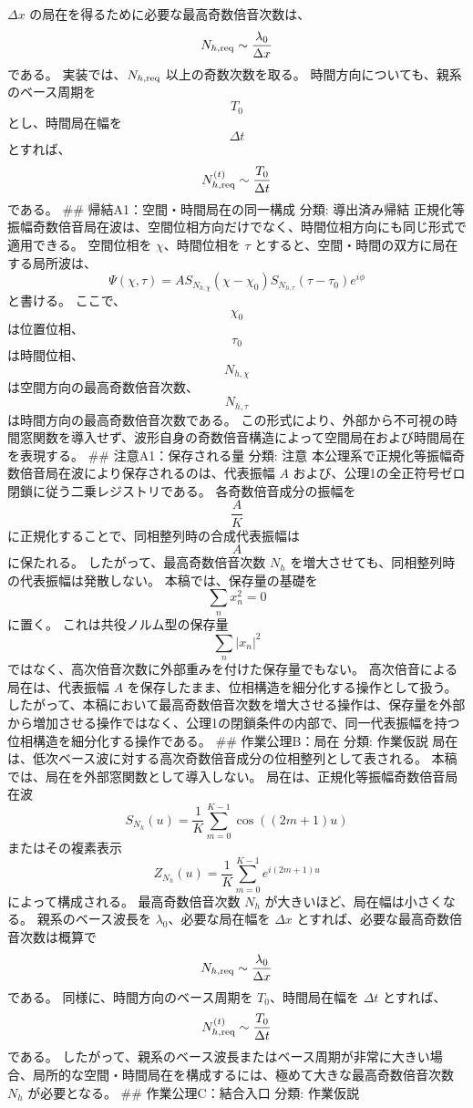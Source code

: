\documentclass[
  a4paper]{ltjsarticle}
\begin{document}
\(\Delta x\) の局在を得るために必要な最高奇数倍音次数は、 \[
N_{h,\rm req}\sim\frac{\lambda_0}{\Delta x}
\] である。 実装では、\(N_{h,\rm req}\) 以上の奇数次数を取る。
時間方向についても、親系のベース周期を \[
T_0
\] とし、時間局在幅を \[
\Delta t
\] とすれば、 \[
N_{h,\rm req}^{(t)}\sim\frac{T_0}{\Delta t}
\] である。 \#\# 帰結A1：空間・時間局在の同一構成 分類: 導出済み帰結
正規化等振幅奇数倍音局在波は、空間位相方向だけでなく、時間位相方向にも同じ形式で適用できる。
空間位相を \(\chi\)、時間位相を \(\tau\)
とすると、空間・時間の双方に局在する局所波は、 \[
\Psi(\chi,\tau)=A S_{N_{h,\chi}}(\chi-\chi_0)S_{N_{h,\tau}}(\tau-\tau_0)e^{i\phi}
\] と書ける。 ここで、 \[
\chi_0
\] は位置位相、 \[
\tau_0
\] は時間位相、 \[
N_{h,\chi}
\] は空間方向の最高奇数倍音次数、 \[
N_{h,\tau}
\] は時間方向の最高奇数倍音次数である。
この形式により、外部から不可視の時間窓関数を導入せず、波形自身の奇数倍音構造によって空間局在および時間局在を表現する。
\#\# 注意A1：保存される量 分類: 注意
本公理系で正規化等振幅奇数倍音局在波により保存されるのは、代表振幅 \(A\)
および、公理1の全正符号ゼロ閉鎖に従う二乗レジストリである。
各奇数倍音成分の振幅を \[
\frac{A}{K}
\] に正規化することで、同相整列時の合成代表振幅は \[
A
\] に保たれる。 したがって、最高奇数倍音次数 \(N_h\)
を増大させても、同相整列時の代表振幅は発散しない。
本稿では、保存量の基礎を \[
\sum_n x_n^2=0
\] に置く。 これは共役ノルム型の保存量 \[
\sum_n |x_n|^2
\] ではなく、高次倍音次数に外部重みを付けた保存量でもない。
高次倍音による局在は、代表振幅 \(A\)
を保存したまま、位相構造を細分化する操作として扱う。
したがって、本稿において最高奇数倍音次数を増大させる操作は、保存量を外部から増加させる操作ではなく、公理1の閉鎖条件の内部で、同一代表振幅を持つ位相構造を細分化する操作である。
\#\# 作業公理B：局在 分類: 作業仮説
局在は、低次ベース波に対する高次奇数倍音成分の位相整列として表される。
本稿では、局在を外部窓関数として導入しない。
局在は、正規化等振幅奇数倍音局在波 \[
S_{N_h}(u)=\frac{1}{K}\sum_{m=0}^{K-1}\cos((2m+1)u)
\] またはその複素表示 \[
Z_{N_h}(u)=\frac{1}{K}\sum_{m=0}^{K-1}e^{i(2m+1)u}
\] によって構成される。 最高奇数倍音次数 \(N_h\)
が大きいほど、局在幅は小さくなる。 親系のベース波長を
\(\lambda_0\)、必要な局在幅を \(\Delta x\)
とすれば、必要な最高奇数倍音次数は概算で \[
N_{h,\rm req}\sim\frac{\lambda_0}{\Delta x}
\] である。 同様に、時間方向のベース周期を \(T_0\)、時間局在幅を
\(\Delta t\) とすれば、 \[
N_{h,\rm req}^{(t)}\sim\frac{T_0}{\Delta t}
\] である。
したがって、親系のベース波長またはベース周期が非常に大きい場合、局所的な空間・時間局在を構成するには、極めて大きな最高奇数倍音次数
\(N_h\) が必要となる。 \#\# 作業公理C：結合入口 分類: 作業仮説
\end{document}
